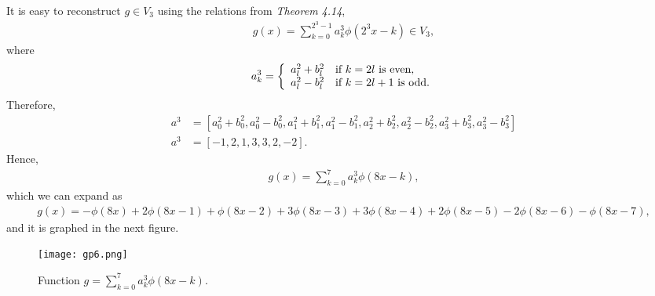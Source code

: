 \begin{questions}

\begin{solution}
It is easy to reconstruct $g\in V_3$ using the relations from \textsl{Theorem 4.14},
\begin{align*}
g(x)=\sum_{k=0}^{2^3-1}a_k^3\phi(2^3x-k)\in V_3,
\end{align*}
where
\begin{align*}
a_k^3=\left\{
\begin{array}{ll}
	 a_l^2+b_l^2 & $if $ k=2l $ is even$, \\
	 a_l^2-b_l^2 & $if $ k=2l+1 $ is odd$.
\end{array} 
\right.\\
\end{align*}
Therefore,
\begin{align*}
a^3&=[a_0^2+b_0^2,a_0^2-b_0^2,a_1^2+b_1^2,a_1^2-b_1^2,a_2^2+b_2^2,a_2^2-b_2^2,a_3^2+b_3^2,a_3^2-b_3^2]\\
a^3&=[-1,2,1,3,3,2,-2].
\end{align*}
Hence,
\begin{align*}
g(x)=\sum_{k=0}^{7}a_k^3\phi(8x-k),
\end{align*}
which we can expand as
\begin{align*}
g(x)=-\phi\left(8x\right)+2\phi\left(8x-1\right)+\phi\left(8x-2\right)+3\phi\left(8x-3\right)+3\phi\left(8x-4\right)+2\phi\left(8x-5\right)-2\phi\left(8x-6\right)-\phi\left(8x-7\right),
\end{align*}
and it is graphed in the next figure.
\begin{figure}[H]
\centering     %
{\texttt{[image: gp6.png]}}
\caption{Function $g=\sum_{k=0}^{7}a_k^3\phi(8x-k)$.}
\end{figure}
\end{solution}
\end{questions}
